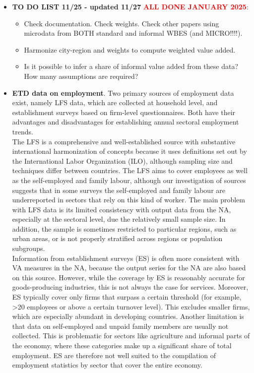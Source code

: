 \documentclass[letterpaper, 12pt]{article}
\begin{document}
\begin{itemize}
    \item \textbf{TO DO LIST 11/25 - updated 11/27} \textcolor{red}{\textbf{ALL DONE JANUARY 2025}}:
    \begin{itemize}
        \item Check documentation. Check weights. Check other papers using microdata from BOTH standard and informal WBES (and MICRO!!!!).
        \item Harmonize city-region and weights to compute weighted value added.
        \item Is it possible to infer a share of informal value added from these data? How many assumptions are required?
    \end{itemize}

    \item \textbf{ETD data on employment}.
    Two primary sources of employment data exist, namely LFS data, which are collected at household level, and establishment surveys based on firm-level questionnaires. Both have their advantages and disadvantages for establishing annual sectoral employment trends.
    \\The LFS is a comprehensive and well-established source with substantive international harmonization of concepts because it uses definitions set out by the International Labor Organization (ILO), although sampling size and techniques differ between countries. The LFS aims to cover employees as well as the self-employed and family labour, although our investigation of sources suggests that in some surveys the self-employed and family labour are underreported in sectors that rely on this kind of worker. The main problem with LFS data is its limited consistency with output data from the NA, especially at the sectoral level, due the relatively small sample size. In addition, the sample is sometimes restricted to particular regions, such as urban areas, or is not properly stratified across regions or population subgroups.
    \\Information from establishment surveys (ES) is often more consistent with VA measures in the NA, because the output series for the NA are also based on this source. However, while the coverage by ES is reasonably accurate for goods-producing industries, this is not always the case for services. Moreover, ES typically cover only firms that surpass a certain threshold (for example, >20 employees or above a certain turnover level). This excludes smaller firms, which are especially abundant in developing countries. Another limitation is that data on self-employed and unpaid family members are usually not collected. This is problematic for sectors like agriculture and informal parts of the economy, where these categories make up a significant share of total employment. ES are therefore not well suited to the compilation of employment statistics by sector that cover the entire economy.

\end{itemize}
\end{document}
